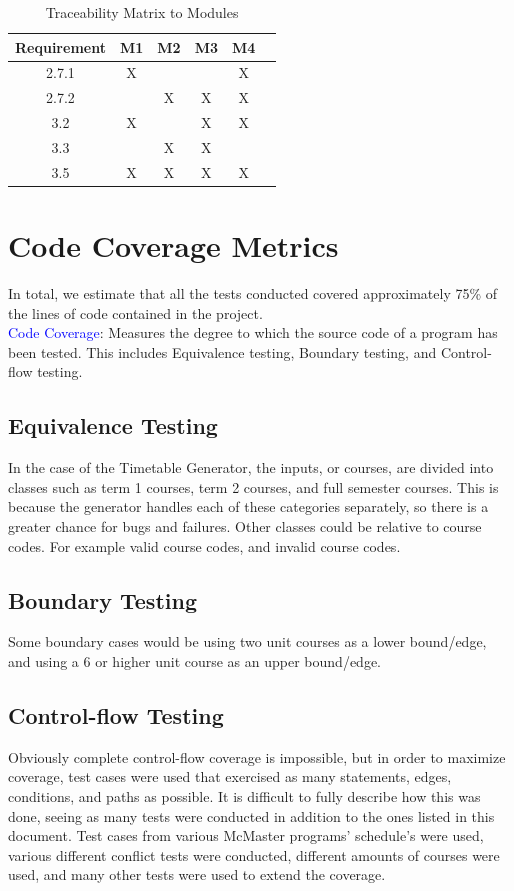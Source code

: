\documentclass[11pt, oneside]{article}
\begin{document}
\begin{table}[h]
\begin{center}
\begin{tabular}{ | c | c | c | c | c | c | }
\hline
 Requirement & M1 & M2 & M3 & M4 \\ 
\hline
 2.7.1 & X & & & X \\  
\hline
 2.7.2 & & X & X & X \\
\hline 
 3.2 & X & & X & X\\ 
\hline
 3.3 & & X & X &\\
\hline
 3.5 & X & X & X & X\\
\hline
\end{tabular}
\end{center}
\caption{Traceability Matrix to Modules}
\end{table}
\newpage
\section{Code Coverage Metrics}
In total, we estimate that all the tests conducted covered approximately 75\% of the lines of code contained in the project. \\
\textcolor{blue}{Code Coverage}: Measures the degree to which the source code of a program has been tested. This includes Equivalence testing, Boundary testing, and Control-flow testing.

\subsection{Equivalence Testing}
In the case of the Timetable Generator, the inputs, or courses, are divided into classes such as term 1 courses, term 2 courses, and full semester courses. This is because the generator handles each of these categories separately, so there is a greater chance for bugs and failures. Other classes could be relative to course codes. For example valid course codes, and invalid course codes.
\subsection{Boundary Testing}
Some boundary cases would be using two unit courses as a lower bound/edge, and using a 6 or higher unit course as an upper bound/edge.
\subsection{Control-flow Testing}
Obviously complete control-flow coverage is impossible, but in order to maximize coverage, test cases were used that exercised as many statements, edges, conditions, and paths as possible. It is difficult to fully describe how this was done, seeing as many tests were conducted in addition to the ones listed in this document. Test cases from various McMaster programs' schedule's were used, various different conflict tests were conducted, different amounts of courses were used, and many other tests were used to extend the coverage.
\end{document}
